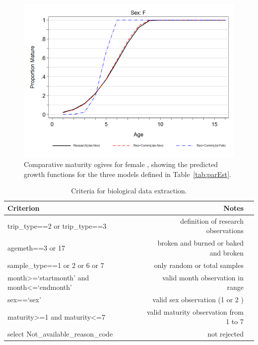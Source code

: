 \begin{figure}[htp]
\captionsetup[subfigure]{labelformat=empty}
\begin{center}
\includegraphics[bb=0 0 925 600,width=6in,keepaspectratio=true]{app-biology/maturityOgiveCompare.png}
\end{center}
\caption{Comparative maturity ogives for female \fishname, showing the predicted growth functions for the three models defined in Table~\ref{tab:parEst}.}
\label{fig:maturityOgiveCompare}
\end{figure}

\clearpage


\begin{table}[b]
\centering
\caption{\label{tab:bioCrit} Criteria for biological data extraction.}
\begin{tabular}{lrr}
\hline
Criterion & Notes \\
\hline
trip\_type==2 or trip\_type==3                               & definition of research observations \\
agemeth==3 or 17                                             & broken and burned or baked and broken \\
sample\_type==1 or 2 or 6 or 7                               & only random or total samples \\
month\textgreater=`startmonth' and month\textless=`endmonth' & valid month observation in range \\
sex==`sex'	                                                 & valid sex observation (1 or 2 ) \\
maturity\textgreater=1 and maturity\textless=7	             & valid maturity observation from 1 to 7 \\
select Not\_available\_reason\_code                          & not rejected \\
\hline
\end{tabular}
\end{table}

